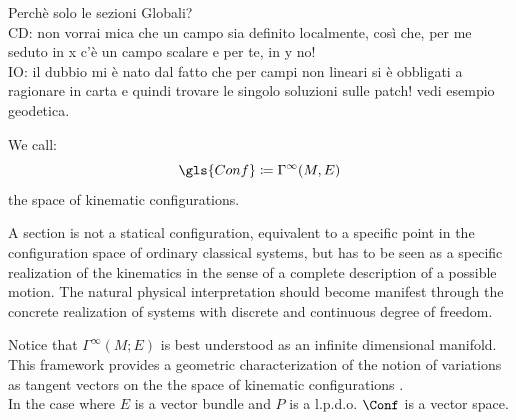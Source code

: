 \documentclass[Main]{subfiles}
\begin{document}
\ifToninus
	\begin{Warning}
		Perchè solo le sezioni Globali?
		\vspace{2mm}\\
		CD: non vorrai mica che un campo sia definito localmente, così che, per me seduto in x c'è un campo scalare e per te, in y no! 		\\
		IO:  il dubbio mi è nato dal fatto che per campi non lineari si è obbligati a ragionare in carta e quindi trovare le singolo soluzioni sulle patch! vedi esempio geodetica.
	\end{Warning}
\fi

	\begin{definition}
		We call:
		\begin{displaymath}
			\gls{Conf} \coloneqq \Gamma^\infty(M,E)
		\end{displaymath}
		the space of kinematic configurations.
	\end{definition}

	A section is not a statical configuration, equivalent to a specific point in the configuration space of ordinary classical systems, but has to be seen as a specific realization of the kinematics in the sense of  a complete description of a possible motion. %
	The natural physical interpretation should become manifest through the concrete realization of systems with discrete and continuous degree of freedom.
	
		\begin{remark}
	Notice that $\Gamma^\infty(M;E)$ is best understood as an infinite dimensional manifold. 
	\\
	This framework provides a geometric characterization of the notion of variations as tangent vectors on the the space of kinematic configurations .\cite{Forger2005}
	\\
	In the case where $E$ is a vector bundle and $P$ is a l.p.d.o. $\Conf$ is a vector space.
		\end{remark}
	
\end{document}
